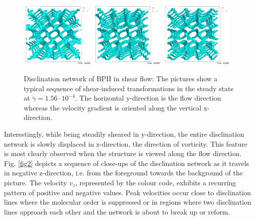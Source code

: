 \documentclass[aps,pre,twocolumn,groupedaddress]{revtex4-1}
\begin{document}
\begin{figure}[h]
\includegraphics[width=0.32\textwidth]{disc-160k_run902.png}
\includegraphics[width=0.32\textwidth]{disc-164k_run902.png}
\includegraphics[width=0.32\textwidth]{disc-165k_run902.png}
\caption{Disclination network of BPII in shear flow: The pictures show a typical sequence of shear-induced transformations in the steady state at $\dot{\gamma}=1.56\cdot 10^{-4}$. The horizontal y-direction is the flow direction whereas the velocity gradient is oriented along the vertical x-direction.}
\label{fig1}
\end{figure}

Interestingly, while being steadily sheared in y-direction, the entire disclination network is slowly displaced in z-direction, the direction of vorticity.
This feature is most clearly observed when the structure is viewed along the flow direction.
Fig. \ref{fig2} depicts a sequence of close-ups of the disclination network as it travels in negative z-direction, i.e. from the foreground towards the background of the picture. 
The velocity $v_z$, represented by the colour code, exhibits a recurring pattern of positive and negative values.
Peak velocities occur close to disclination lines where the molecular order is suppressed or in regions where two disclination lines approach each other and the network is about to break up or reform. 
\end{document}
